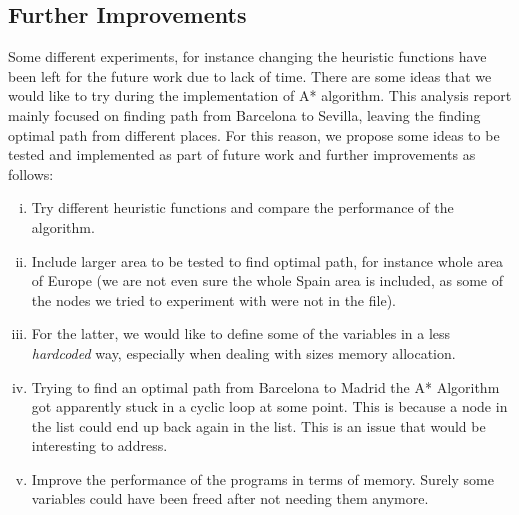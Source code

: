 \newpage
\subsection{Further Improvements}

Some different experiments, for instance changing the heuristic functions have been left for the future work due to lack of time. There are some ideas that we would like to try during the implementation of A* algorithm. This analysis report mainly focused on finding path from Barcelona to Sevilla, leaving the finding optimal path from different places. For this reason, we propose some ideas to be tested and implemented as part of future work and further improvements as follows:
\begin{enumerate}[(i)]
	\item Try different heuristic functions and compare the performance of the algorithm.
    \item Include larger area to be tested to find optimal path, for instance whole area of Europe (we are not even sure the whole Spain area is included, as some of the nodes we tried to experiment with were not in the  file).
    \item For the latter, we would like to define some of the variables in a less \emph{hardcoded} way, especially when dealing with sizes memory allocation.
    \item Trying to find an optimal path from Barcelona to Madrid the A* Algorithm got apparently stuck in a cyclic loop at some point. This is because a node in the  list could end up back again in the  list. This is an issue that would be interesting to address.
	\item Improve the performance of the programs in terms of memory. Surely some variables could have been freed after not needing them anymore.
\end{enumerate}


